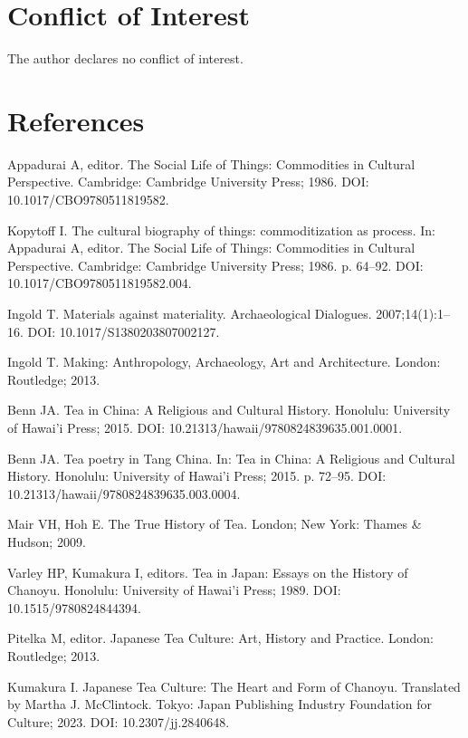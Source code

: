 \documentclass[11pt,a4paper]{article}
\newenvironment{refs}{%
  \begin{list}{}{%
    \setlength{\leftmargin}{1.6em}
    \setlength{\itemindent}{-1.6em}
    \setlength{\itemsep}{0.6em}
    \setlength{\parsep}{0pt}
  }
}{\end{list}}
\newcommand{\refitem}[2]{\item[] [#1] #2}
\begin{document}
\section*{Conflict of Interest}

The author declares no conflict of interest.

\section*{References}
\begin{refs}

\refitem{1}{Appadurai A, editor. The Social Life of Things: Commodities in Cultural Perspective. Cambridge: Cambridge University Press; 1986. DOI: 10.1017/CBO9780511819582.}

\refitem{2}{Kopytoff I. The cultural biography of things: commoditization as process. In: Appadurai A, editor. The Social Life of Things: Commodities in Cultural Perspective. Cambridge: Cambridge University Press; 1986. p. 64--92. DOI: 10.1017/CBO9780511819582.004.}

\refitem{3}{Ingold T. Materials against materiality. Archaeological Dialogues. 2007;14(1):1--16. DOI: 10.1017/S1380203807002127.}

\refitem{4}{Ingold T. Making: Anthropology, Archaeology, Art and Architecture. London: Routledge; 2013.}

\refitem{5}{Benn JA. Tea in China: A Religious and Cultural History. Honolulu: University of Hawai'i Press; 2015. DOI: 10.21313/hawaii/9780824839635.001.0001.}

\refitem{6}{Benn JA. Tea poetry in Tang China. In: Tea in China: A Religious and Cultural History. Honolulu: University of Hawai'i Press; 2015. p. 72--95. DOI: 10.21313/hawaii/9780824839635.003.0004.}

\refitem{7}{Mair VH, Hoh E. The True History of Tea. London; New York: Thames \& Hudson; 2009.}

\refitem{8}{Varley HP, Kumakura I, editors. Tea in Japan: Essays on the History of Chanoyu. Honolulu: University of Hawai'i Press; 1989. DOI: 10.1515/9780824844394.}

\refitem{9}{Pitelka M, editor. Japanese Tea Culture: Art, History and Practice. London: Routledge; 2013.}

\refitem{10}{Kumakura I. Japanese Tea Culture: The Heart and Form of Chanoyu. Translated by Martha J. McClintock. Tokyo: Japan Publishing Industry Foundation for Culture; 2023. DOI: 10.2307/jj.2840648.}


\end{refs}
\end{document}
